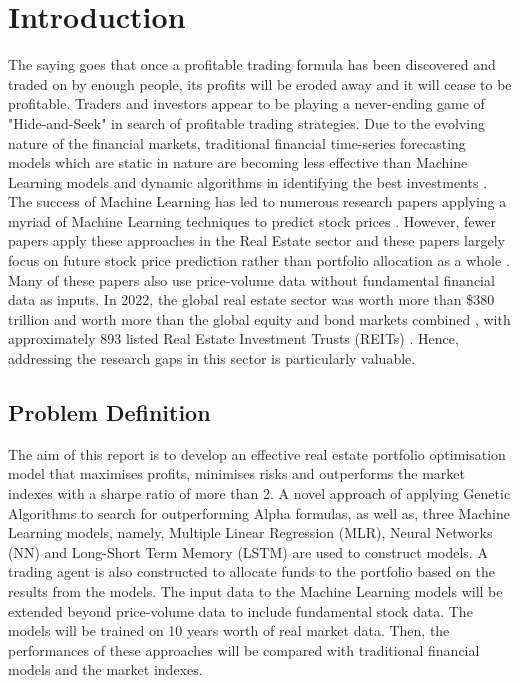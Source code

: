 \documentclass[a4paper,12pt]{report}
\renewcommand\thechapter{\Roman{chapter}}
\numberwithin{equation}{section}
\theoremstyle{definition}
\begin{document}
\tableofcontents


\setcounter{chapter}{1}
\renewcommand{\thechapter}{\arabic{chapter}}
\setcounter{chapter}{0}
\chapter{Introduction}
The saying goes that once a profitable trading formula has been discovered and traded on by enough people, its profits will be eroded away and it will cease to be profitable. Traders and investors appear to be playing a never-ending game of "Hide-and-Seek" in search of profitable trading strategies. Due to the evolving nature of the financial markets, traditional financial time-series forecasting models which are static in nature are becoming less effective than Machine Learning models and dynamic algorithms in identifying the best investments \citep{sheth_predicting_2023}. The success of Machine Learning has led to numerous research papers applying a myriad of Machine Learning techniques to predict stock prices \citep{obthong_survey_2020}. However, fewer papers apply these approaches in the Real Estate sector and these papers largely focus on future stock price prediction rather than portfolio allocation as a whole \citep{habbab_-depth_2024}. Many of these papers also use price-volume data without fundamental financial data as inputs. In 2022, the global real estate sector was worth more than \$380 trillion and worth more than the global equity and bond markets combined \citep{tostevin_total_2023}, with approximately 893 listed Real Estate Investment Trusts (REITs) \citep{nareit_global_2024}. Hence, addressing the research gaps in this sector is particularly valuable.



\section{Problem Definition}
The aim of this report is to develop an effective real estate portfolio optimisation model that maximises profits, minimises risks and outperforms the market indexes with a sharpe ratio of more than 2. A novel approach of applying Genetic Algorithms to search for outperforming Alpha formulas, as well as, three Machine Learning models, namely, Multiple Linear Regression (MLR), Neural Networks (NN) and Long-Short Term Memory (LSTM) are used to construct models. A trading agent is also constructed to allocate funds to the portfolio based on the results from the models. The input data to the Machine Learning models will be extended beyond price-volume data to include fundamental stock data. The models will be trained on 10 years worth of real market data. Then, the performances of these approaches will be compared with traditional financial models and the market indexes.
\end{document}
